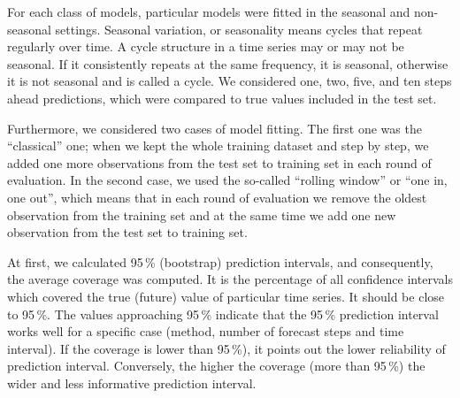 \documentclass[runningheads]{llncs}
\begin{document}
For each class of models, particular models were fitted in the seasonal and non-seasonal settings. Seasonal variation, or seasonality means cycles that repeat regularly over time. A cycle structure in a time series may or may not be seasonal. If it consistently repeats at the same frequency, it is seasonal, otherwise it is not seasonal and is called a cycle. We considered one, two, five, and ten steps ahead predictions, which were compared to true values included in the test set. 

Furthermore, we considered two cases of model fitting. The first one was the “classical” one; when we kept the whole training dataset and step by step, we added one more observations from the test set to training set in each round of evaluation. In the second case, we used the so-called “rolling window” or “one in, one out”, which means that in each round of evaluation we remove the oldest observation from the training set and at the same time we add one new observation from the test set to training set.

At first, we calculated 95\,\% (bootstrap) prediction intervals, and consequently, the average coverage was computed. It is the percentage of all confidence intervals which covered the true (future) value of particular time series. It should be close to 95\,\%. The values approaching 95\,\% indicate that the 95\,\% prediction interval works well for a specific case (method, number of forecast steps and time interval). If the coverage is lower than 95\,\%), it points out the lower reliability of prediction interval. Conversely, the higher the coverage (more than 95\,\%) the wider and less informative prediction interval.
\end{document}
